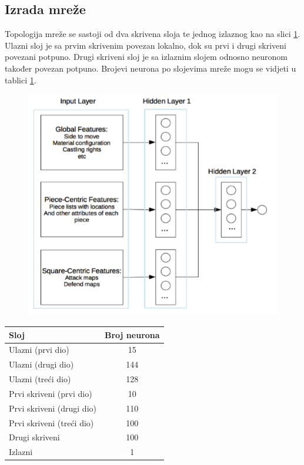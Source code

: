 \documentclass[journal]{IEEEtran}
\begin{document}
\subsection{Izrada mreže}
Topologija mreže se sastoji od dva skrivena sloja te jednog izlaznog kao na slici \ref{fig:topologija}. Ulazni sloj je sa prvim skrivenim povezan lokalno, dok su prvi i drugi skriveni povezani potpuno. Drugi skriveni sloj je sa izlaznim slojem odnosno neuronom također povezan potpuno. Brojevi neurona po slojevima mreže mogu se vidjeti u tablici \ref{tab:brneurona}.
\begin{figure}[H]
	\centering
	\includegraphics[width=.8\linewidth]{networkArchitecture.png}
	\label{fig:topologija}
\end{figure}
\begin{table}[]
\centering
{}
\label{tab:brneurona}
\begin{tabular}{lc}
\textbf{Sloj} & \multicolumn{1}{l}{\textbf{Broj neurona}} \\ \hline
Ulazni (prvi dio)           	& 15		\\
Ulazni (drugi dio)		& 144		\\
Ulazni (treći dio)		& 128		\\
Prvi skriveni (prvi dio)	& 10		\\
Prvi skriveni (drugi dio)	& 110		\\
Prvi skriveni (treći dio)	& 100		\\
Drugi skriveni		& 100		\\
Izlazni				& 1		\\                    
\end{tabular}
\end{table}
\end{document}
